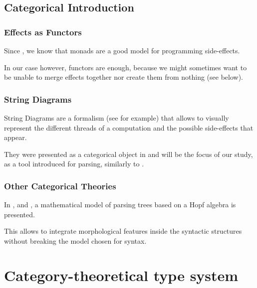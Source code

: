 \documentclass[math, english, info]{beamercours}
\begin{document}
\subsection{Categorical Introduction}
\begin{frame}
	\frametitle{Effects as Functors}
	Since \cite{moggiComputationalLambdacalculusMonads1989}, we know that monads
	are a good model for programming side-effects.

	\pause

	\medskip

	In our case however, functors are enough, because we might sometimes want to be unable
	to merge effects together nor create them from nothing (see below).
\end{frame}

\begin{frame}
	\frametitle{String Diagrams}
	String Diagrams are a formalism (see \cite{hinzeIntroducingStringDiagrams2023}
	for example) that allows to visually represent the different threads of a
	computation and the possible side-effects that appear.

	\pause

	\medskip

	They were presented as a categorical object in
	\cite{joyalGeometryTensorCalculus1991} and will be the focus of our study, as
	a tool introduced for parsing, similarly to
	\cite{coeckeMathematicalFoundationsCompositional2010}.
\end{frame}

\begin{frame}
	\frametitle{Other Categorical Theories}
	In \cite{marcollimatildeetchomskynoametberwickrobertc.MathematicalStructureSyntactic},
	and \cite{senturiaAlgebraicStructureMorphosyntax2025}, a mathematical model
	of parsing trees based on a Hopf algebra is presented.

	\medskip

	This allows to integrate morphological features inside the syntactic
	structures without breaking the model chosen for syntax.
\end{frame}

\section{Category-theoretical type system}
\end{document}
